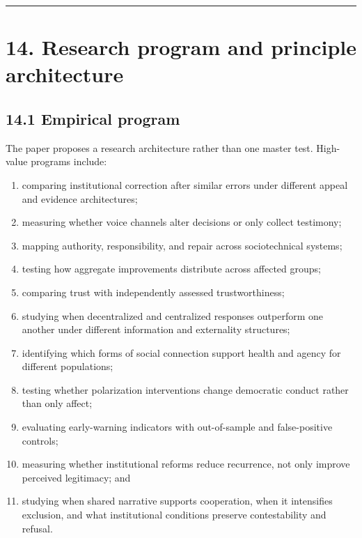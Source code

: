 \documentclass[
  11pt,
]{article}
\providecommand{\tightlist}{%
  \setlength{\itemsep}{0pt}\setlength{\parskip}{0pt}}
\begin{document}
\begin{center}\rule{0.5\linewidth}{0.5pt}\end{center}

\section{14. Research program and principle
architecture}\label{research-program-and-principle-architecture}

\subsection{14.1 Empirical program}\label{empirical-program}

The paper proposes a research architecture rather than one master test.
High-value programs include:

\begin{enumerate}
\def\labelenumi{\arabic{enumi}.}
\tightlist
\item
  comparing institutional correction after similar errors under
  different appeal and evidence architectures;
\item
  measuring whether voice channels alter decisions or only collect
  testimony;
\item
  mapping authority, responsibility, and repair across sociotechnical
  systems;
\item
  testing how aggregate improvements distribute across affected groups;
\item
  comparing trust with independently assessed trustworthiness;
\item
  studying when decentralized and centralized responses outperform one
  another under different information and externality structures;
\item
  identifying which forms of social connection support health and agency
  for different populations;
\item
  testing whether polarization interventions change democratic conduct
  rather than only affect;
\item
  evaluating early-warning indicators with out-of-sample and
  false-positive controls;
\item
  measuring whether institutional reforms reduce recurrence, not only
  improve perceived legitimacy; and
\item
  studying when shared narrative supports cooperation, when it
  intensifies exclusion, and what institutional conditions preserve
  contestability and refusal.
\end{enumerate}
\end{document}
